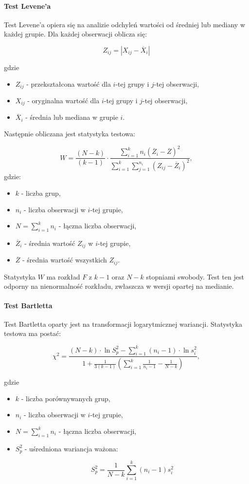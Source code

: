 \documentclass[12pt,a4paper]{article}
\begin{document}
\paragraph{Test Levene’a \cite{levene1960robust}}
Test Levene’a opiera się na analizie odchyleń wartości od średniej lub mediany w każdej grupie. Dla każdej obserwacji oblicza się:

$$
Z_{ij} = |X_{ij} - \overline{X}_i|
$$

gdzie 
\begin{itemize}
    \item $Z_{ij}$ - przekształcona wartość dla $i$-tej grupy i $j$-tej obserwacji,
    \item $X_{ij}$ - oryginalna wartość dla $i$-tej grupy i $j$-tej obserwacji,
    \item $\overline{X}_i$ - średnia lub mediana w grupie $i$.
\end{itemize} 
Następnie obliczana jest statystyka testowa:

$$
W = \frac{(N - k)}{(k - 1)} \cdot \frac{\sum_{i=1}^{k} n_i (\overline{Z}_{i} - \overline{Z})^2}{\sum_{i=1}^{k} \sum_{j=1}^{n_i} (Z_{ij} - \overline{Z}_{i})^2}
,$$
gdzie:
\begin{itemize}
    \item $k$ - liczba grup,
    \item $n_i$ - liczba obserwacji w $i$-tej grupie,
    \item $N = \sum_{i=1}^{k} n_i$ - łączna liczba obserwacji,
    \item $\overline{Z}_{i}$ - średnia wartość $Z_{ij}$ w $i$-tej grupie,
    \item $\overline{Z}$ - średnia wartość wszystkich $Z_{ij}$.
\end{itemize}
Statystyka $W$ ma rozkład $F$ z $k - 1$ oraz $N - k$ stopniami swobody. Test ten jest odporny na nienormalność rozkładu, zwłaszcza w wersji opartej na medianie.

\newpage
\paragraph{Test Bartletta \cite{bartlett1937properties}}
Test Bartletta oparty jest na transformacji logarytmicznej wariancji. Statystyka testowa ma postać:

$$
\chi^2 = \frac{(N - k) \cdot \ln S_p^2 - \sum_{i=1}^{k} (n_i - 1) \cdot \ln s_i^2}{1 + \frac{1}{3(k - 1)} \left( \sum_{i=1}^{k} \frac{1}{n_i - 1} - \frac{1}{N - k} \right)},
$$

gdzie 
\begin{itemize}
     \item $k$ - liczba porównywanych grup,
      \item $n_i$ - liczba obserwacji w $i$-tej grupie,
      \item $N = \sum_{i=1}^{k} n_i$ - łączna liczba obserwacji,
    \item $S_p^2$ - uśredniona wariancja ważona:

$$
S_p^2 = \frac{1}{N - k} \sum_{i=1}^{k} (n_i - 1) s_i^2
$$
\end{itemize}
\end{document}
